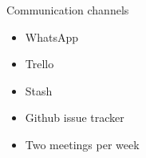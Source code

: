 \begin{frame}{Communication channels}
\begin{itemize}
		\item WhatsApp
		\item Trello
		\item Stash
		\item Github issue tracker
		\item Two meetings per week
	\end{itemize}
\end{frame}